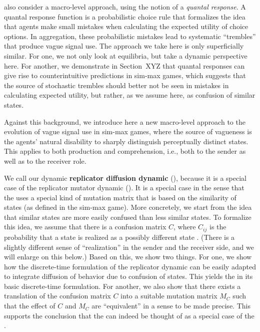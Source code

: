 \citet{FrankeJager2010:Vagueness-Signa} also consider a macro-level
approach, using the notion of a \emph{quantal response}. A quantal
response function is a probabilistic choice rule that formalizes the
idea that agents make small mistakes when calculating the expected
utility of choice options. In aggregation, these probabilistic
mistakes lead to systematic ``trembles'' that produce vague signal
use. The approach we take here is only superficially similar. For one,
we not only look at equilibria, but take a dynamic perspective
here. For another, we demonstrate in Section~XYZ that quantal
responses can give rise to counterintuitive predictions in sim-max
games, which suggests that the source of stochastic trembles should
better not be seen in mistakes in calculating expected utility, but
rather, as we assume here, as confusion of similar states.

Against this background, we introduce here a new macro-level approach
to the evolution of vague signal use in sim-max games, where the
source of vagueness is the agents' natural disability to sharply
distinguish perceptually distinct states. This applies to both
production and comprehension, i.e., both to the sender as well as to
the receiver role. 

We call our dynamic \textbf{replicator diffusion dynamic} (\rdd),
because it is a special case of the replicator mutator dynamic
(\rmd). It is a special case in the sense that the \rdd uses a special
kind of mutation matrix that is based on the similarity of states (as
defined in the sim-max game). More concretely, we start from the idea
that similar states are more easily confused than less similar
states. To formalize this idea, we assume that there is a confusion
matrix $C$, where $C_{ij}$ is the probability that a state 
is realized as a possibly different state . (There is a
slightly different sense of ``realization'' in the sender and the
receiver side, and we will enlarge on this below.) Based on this, we
show two things. For one, we show how the discrete-time formulation of
the replicator dynamic can be easily adapted to integrate diffusion of
behavior due to confusion of states. This yields the \rdd in its basic
discrete-time formulation. For another, we also show that there exists
a translation of the confusion matrix $C$ into a suitable mutation
matrix $M_C$ such that the effect of $C$ and $M_C$ are ``equivalent''
in a sense to be made precise. This supports the conclusion that the
\rdd can indeed be thought of as a special case of the \rmd.

